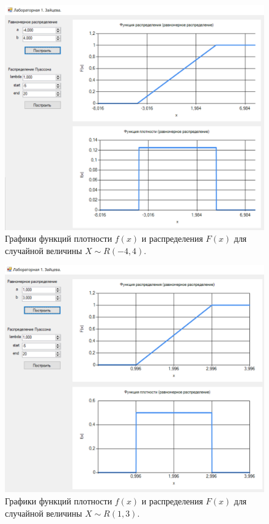 \documentclass[14pt, a4paper]{extarticle}
\begin{document}
\begin{figure}[h!]
	\begin{center}
		\includegraphics[scale=0.7]{pictures/u1.png}
	\end{center}
	\captionsetup{justification=centering}
	\caption{Графики функций плотности $f(x)$ и распределения $F(x)$ для случайной величины $X \sim R(-4, 4)$.}
	\label{fig:u1}
\end{figure}

\clearpage
\begin{figure}[h!]
	\begin{center}
		\includegraphics[scale=0.7]{pictures/u2.png}
	\end{center}
	\captionsetup{justification=centering}
	\caption{Графики функций плотности $f(x)$ и распределения $F(x)$ для случайной величины $X \sim R(1, 3)$.}
	\label{fig:u2}
\end{figure}
\end{document}
